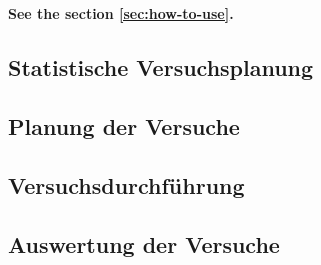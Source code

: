 \chapter{}
\label{sec:Versuche}

\textbf{See the section \ref{sec:how-to-use}.}

\section{Statistische Versuchsplanung}

\section{Planung der Versuche}

\section{Versuchsdurchführung}

\section{Auswertung der Versuche}

